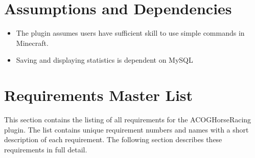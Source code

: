 \documentclass[a4paper, 11pt]{article} %
\begin{document}
\section{Assumptions and Dependencies}

\begin{itemize}
	\item The plugin assumes users have sufficient skill to use simple commands in Minecraft.
	\item Saving and displaying statistics is dependent on MySQL
\end{itemize}

\newpage

\section{Requirements Master List}

This section contains the listing of all requirements for the ACOGHorseRacing plugin. The list contains unique requirement numbers and names with a short description of each requirement. The following section describes these requirements in full detail.
\end{document}

